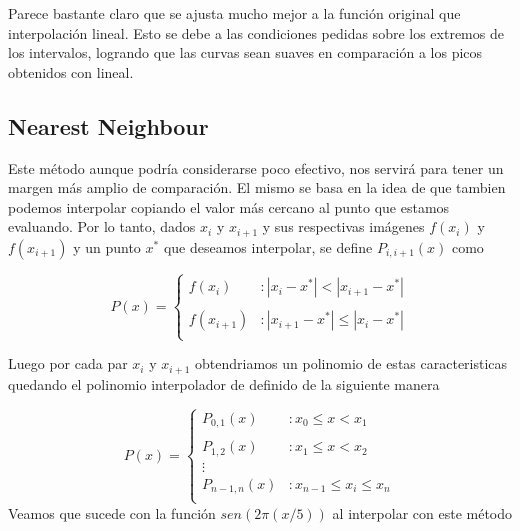 Parece bastante claro que se ajusta mucho mejor a la función original que interpolación lineal. Esto se debe a las condiciones pedidas sobre los extremos de los intervalos, logrando que las curvas sean suaves en comparación a los picos obtenidos con lineal. 

\pagebreak

\subsection{Nearest Neighbour}

Este método aunque podría considerarse poco efectivo, nos servirá para tener un margen más amplio de comparación. El mismo se basa en la idea de que tambien podemos interpolar copiando el valor más cercano al punto que estamos evaluando. 
Por lo tanto, dados $x_i$ y $x_{i+1}$ y sus respectivas imágenes $f(x_i)$ y $f(x_{i+1})$ y un punto $x^*$ que deseamos interpolar, se define $P_{i, i+1}(x)$ como
 
\vspace{4mm}
\begin{displaymath}
   P(x) = \left\{
     \begin{array}{lr}
       f(x_i)  & : |x_i - x^*| < |x_{i+1} - x^*|\\\\
       f(x_{i+1})  & : |x_{i+1} - x^*| \leq |x_i - x^*|\\
     \end{array}
   \right.
\end{displaymath} 

Luego por cada par $x_i$ y $x_{i+1}$ obtendriamos un polinomio de estas caracteristicas quedando el polinomio interpolador de definido de la siguiente manera

\vspace{4mm}
\begin{displaymath}
   P(x) = \left\{
     \begin{array}{lr}
       P_{0,1}(x)  & : x_0 \leq x < x_1\\\\
       P_{1,2}(x)  & : x_1 \leq x < x_2\\
       \vdots\\
       P_{n-1,n}(x) & : x_{n-1} \leq x_i \leq x_n\\
     \end{array}
   \right.
\end{displaymath} 
\vspace{4mm}
Veamos que sucede con la función $sen(2\pi(x/5))$ al interpolar con este método

